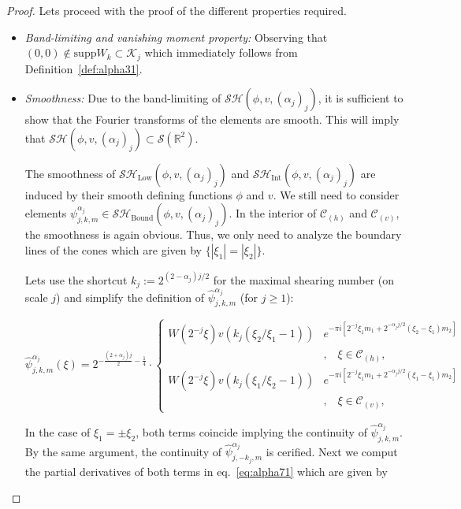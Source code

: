 \begin{proof}
Lets proceed with the proof of the different properties required.
\begin{itemize}
\item\textit{Band-limiting and vanishing moment property:} Observing that $(0,0)\notin \text{supp}W_k\subset \mathcal{K}_j$ which immediately follows from Definition~\ref{def:alpha31}.
\item\textit{Smoothness:} Due to the band-limiting of $\mathcal{SH}(\phi,v,(\alpha_j)_j)$, it is sufficient to show that the Fourier transforms of the elements are smooth. This will imply that $\mathcal{SH}(\phi,v,(\alpha_j)_j)\subset \mathcal{S}(\mathbb{R}^2)$. 

\bigskip

The smoothness of $\mathcal{SH}_{\text{Low}}(\phi,v,(\alpha_j)_j)$ and $\mathcal{SH}_{\text{Int}}(\phi,v,(\alpha_j)_j)$ are induced by their smooth defining functions $\phi$ and $v$. We still need to consider elements $\psi^{\alpha_j}_{j,k,m}\in\mathcal{SH}_{\text{Bound}}(\phi,v,(\alpha_j)_j)$. In the interior of $\mathcal{C}_{(h)}$ and $\mathcal{C}_{(v)}$, the smoothness is again obvious. Thus, we only need to analyze the boundary lines of the cones which are given by $\{|\xi_1|=|\xi_2|\}$.

\bigskip

Lets use the shortcut $k_j:=2^{(2-\alpha_j)j/2}$ for the maximal shearing number (on scale $j$) and simplify the definition of $\hat{\psi}_{j,k,m}^{\alpha_j}$ (for $j\geq 1$):

\begin{equation}
\label{eq:alpha71}
\hat{\psi}^{\alpha_j}_{j,k,m}(\xi)=2^{-\frac{(2+\alpha_j)j}{2}-\frac{1}{4}}\cdot
\begin{cases}
W(2^{-j}\xi)v(k_j(\xi_2/\xi_1-1))&e^{-\pi i[2^{-j}\xi_1 m_1+2^{-\alpha_j j/2}(\xi_2-\xi_1)m_2]}\\
& \textrm{,}\quad \xi\in\mathcal{C}_{(h)},\\
W(2^{-j}\xi)v(k_j(\xi_1/\xi_2-1))&e^{-\pi i[2^{-j}\xi_1 m_1+2^{-\alpha_j j/2}(\xi_1-\xi_1)m_2]}\\
&\textrm{,}\quad \xi\in\mathcal{C}_{(v)},
\end{cases}
\end{equation}

In the case of $\xi_1=\pm \xi_2$, both terms coincide implying the continuity of $\hat{\psi}_{j,k,m}^{\alpha_j}$. By the same argument, the continuity of $\hat{\psi}_{j,-k_j,m}^{\alpha_j}$ is cerified. Next we comput the partial derivatives of both terms in eq.~\ref{eq:alpha71} which are given by


\end{itemize}
\end{proof}

